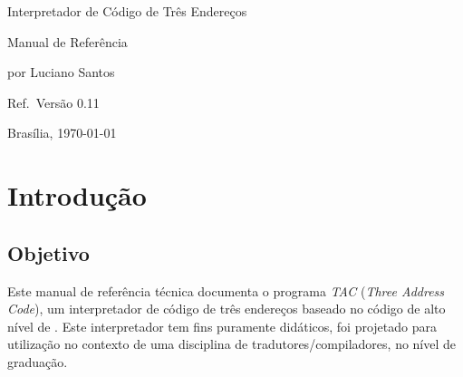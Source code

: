 \documentclass[12pt,a4paper,extrafontsizes,article]{memoir}
\begin{document}
\frontmatter
\pagestyle{empty}

\vspace*{\fill}
\begin{center}
\par
\Large{Interpretador de Código de Três Endereços}\par
\LARGE{Manual de Referência}\par
\vspace*{\fill}
\large{por Luciano Santos}\par
\bigskip
\normalsize{}\par
\medskip
\normalsize{Ref.\ Versão 0.11}\par
\medskip
\normalsize{Brasília, \today}\par
\end{center}


\clearpage

\pagestyle{headings}

\tableofcontents
\clearpage
\listoftables
\clearpage

\mainmatter


\chapter{Introdução}

\section{Objetivo}

Este manual de referência técnica documenta o programa \textit{TAC} (\textit{Three Address Code}), um interpretador de
código de três endereços baseado no código de alto nível de \citeauthor{Aho:1986:CPT:6448}. Este interpretador tem fins
puramente didáticos, foi projetado para utilização no contexto de uma disciplina de tradutores/compiladores, no nível de
graduação.
\end{document}

